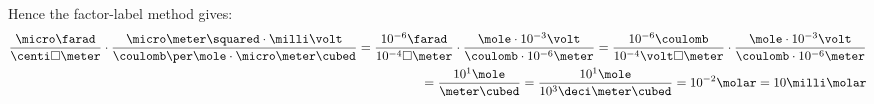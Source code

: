 \documentclass{article}
\begin{document}
Hence the factor-label method gives: 
\begin{equation}
  \begin{split}
  \frac{\micro\farad}{\centi\square\meter}\cdot\frac{\micro\meter\squared\cdot\milli\volt}%
  {\coulomb\per\mole\cdot\micro\meter\cubed}
  = \frac{10^{-6} \farad}{10^{-4}\square\meter}\cdot\frac{\mole\cdot10^{-3}\volt}%
  {\coulomb\cdot10^{-6}\meter}
  = \frac{10^{-6} \coulomb}{10^{-4}\volt\square\meter}\cdot\frac{\mole\cdot10^{-3}\volt}%
  {\coulomb\cdot10^{-6}\meter}\\
  = \frac{10^1\mole}{\meter\cubed} =
  \frac{10^1\mole}{10^3\deci\meter\cubed} = 10^{-2}\molar = 10\milli\molar
  \end{split}
\end{equation}
  
\end{document}
